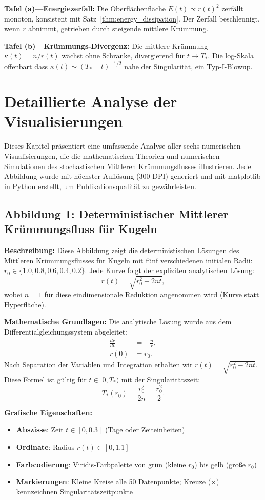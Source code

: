 \documentclass[a4paper,12pt]{article}
\theoremstyle{definition}
\begin{document}
\textbf{Tafel (a)---Energiezerfall:} Die Oberflächenfläche $E(t) \propto r(t)^2$ zerfällt monoton, konsistent mit Satz~\ref{thm:energy_dissipation}. Der Zerfall beschleunigt, wenn $r$ abnimmt, getrieben durch steigende mittlere Krümmung.

\textbf{Tafel (b)---Krümmungs-Divergenz:} Die mittlere Krümmung $\kappa(t) = n/r(t)$ wächst ohne Schranke, divergierend für $t \to T_*$. Die log-Skala offenbart dass $\kappa(t) \sim (T_* - t)^{-1/2}$ nahe der Singularität, ein Typ-I-Blowup.

\section{Detaillierte Analyse der Visualisierungen}
\label{sec:figures}

Dieses Kapitel präsentiert eine umfassende Analyse aller sechs numerischen Visualisierungen, die die mathematischen Theorien und numerischen Simulationen des stochastischen Mittleren Krümmungsflusses illustrieren. Jede Abbildung wurde mit höchster Auflösung (300 DPI) generiert und mit matplotlib in Python erstellt, um Publikationsqualität zu gewährleisten.

\subsection{Abbildung 1: Deterministischer Mittlerer Krümmungsfluss für Kugeln}

\textbf{Beschreibung:} Diese Abbildung zeigt die deterministischen Lösungen des Mittleren Krümmungsflusses für Kugeln mit fünf verschiedenen initialen Radii: $r_0 \in \{1.0, 0.8, 0.6, 0.4, 0.2\}$. Jede Kurve folgt der expliziten analytischen Lösung:
\[
r(t) = \sqrt{r_0^2 - 2nt},
\]
wobei $n=1$ für diese eindimensionale Reduktion angenommen wird (Kurve statt Hyperfläche).

\textbf{Mathematische Grundlagen:} Die analytische Lösung wurde aus dem Differentialgleichungssystem abgeleitet:
\begin{align}
\frac{dr}{dt} &= -\frac{n}{r}, \\
r(0) &= r_0.
\end{align}
Nach Separation der Variablen und Integration erhalten wir $r(t) = \sqrt{r_0^2 - 2nt}$. Diese Formel ist gültig für $t \in [0, T_*)$ mit der Singularitätszeit:
\[
T_*(r_0) = \frac{r_0^2}{2n} = \frac{r_0^2}{2}.
\]

\textbf{Grafische Eigenschaften:}
\begin{itemize}
	\item \textbf{Abszisse}: Zeit $t \in [0, 0.3]$ (Tage oder Zeiteinheiten)
	\item \textbf{Ordinate}: Radius $r(t) \in [0, 1.1]$
	\item \textbf{Farbcodierung}: Viridis-Farbpalette von grün (kleine $r_0$) bis gelb (große $r_0$)
	\item \textbf{Markierungen}: Kleine Kreise alle 50 Datenpunkte; Kreuze (×) kennzeichnen Singularitätszeitpunkte
\end{itemize}
\end{document}

